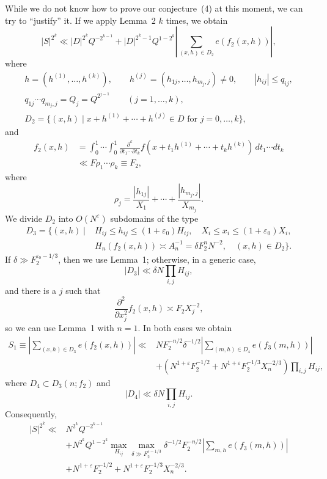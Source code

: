 \documentclass[10pt]{article}
\begin{document}
While we do not know how to prove our conjecture~(4) at this moment, we can try to ``justify'' it. If we apply Lemma~2 $k$ times, we obtain
\[
  |S|^{2^k}\ll |D|^{2^k}Q^{-2^{k-1}}
  +|D|^{2^k-1}Q^{1-2^k}
  \left|\sum_{(x,h)\in D_2}e(f_2(x,h))\right|,
\]
where
\[
\begin{gathered}
  h=(h^{(1)},\ldots,h^{(k)}),
  \qquad h^{(j)}=(h_{1j},\ldots,h_{m_j,j})\ne0,
  \qquad |h_{ij}|\leqslant q_{ij},\\
  q_{1j}\cdots q_{m_j,j}=Q_j=Q^{2^{j-1}}
  \qquad(j=1,\ldots,k),\\
  D_2=\{(x,h)\mid x+h^{(1)}+\cdots+h^{(j)}\in D
  \text{ for }j=0,\ldots,k\},
\end{gathered}
\]
and
\[
\begin{aligned}
  f_2(x,h)
  &=\int_0^1\cdots\int_0^1
  \frac{\partial^k}{\partial t_1\cdots\partial t_k}
  f(x+t_1h^{(1)}+\cdots+t_kh^{(k)})\,dt_1\cdots dt_k\\
  &\ll F\rho_1\cdots\rho_k\equiv F_2,
\end{aligned}
\]
where
\[
  \rho_j=\frac{|h_{1j}|}{X_1}+\cdots+\frac{|h_{m_j,j}|}{X_{m_j}}.
\]
We divide $D_2$ into $O(N^\varepsilon)$ subdomains of the type
\[
\begin{aligned}
D_3=\{(x,h)\mid{}&H_{ij}\leqslant h_{ij}\leqslant(1+\varepsilon_0)H_{ij},
\quad X_i\leqslant x_i\leqslant(1+\varepsilon_0)X_i,\\
& H_n(f_2(x,h))\asymp A_n^{-1}=\delta F_2^nN^{-2},
\quad (x,h)\in D_2\}.
\end{aligned}
\]
If $\delta\gg F_2^{\varepsilon_0-1/3}$, then we use Lemma~1; otherwise, in a generic case,
\[
  |D_3|\ll\delta N\prod_{i,j}H_{ij},
\]
and there is a $j$ such that
\[
  \frac{\partial^2}{\partial x_j^2}f_2(x,h)\asymp F_2X_j^{-2},
\]
so we can use Lemma~1 with $n=1$. In both cases we obtain
\[
\begin{aligned}
S_1\equiv\left|\sum_{(x,h)\in D_3}e(f_2(x,h))\right|
\ll{}&NF_2^{-n/2}\delta^{-1/2}
\left|\sum_{(m,h)\in D_4}e(f_3(m,h))\right|\\
&+\left(N^{1+\varepsilon}F_2^{-1/2}
 +N^{1+\varepsilon}F_2^{-1/3}X_n^{-2/3}\right)\prod_{i,j}H_{ij},
\end{aligned}
\]
where $D_4\subset D_3(n;f_2)$ and
\[
  |D_4|\ll\delta N\prod_{i,j}H_{ij}.
\]
Consequently,
\[
\begin{aligned}
|S|^{2^k}\ll{}&N^{2^k}Q^{-2^{k-1}}\\
&+N^{2^k}Q^{1-2^k}
 \max_{H_{ij}}\max_{\delta\gg F_2^{\varepsilon-1/3}}
 \delta^{-1/2}F_2^{-n/2}
 \left|\sum_{m,h}e(f_3(m,h))\right|\\
&+N^{1+\varepsilon}F_2^{-1/2}
 +N^{1+\varepsilon}F_2^{-1/3}X_n^{-2/3}.
\end{aligned}
\]
\end{document}

